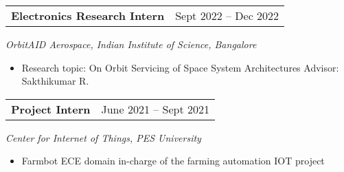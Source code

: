 \begin{tabular}{@{}p{4in}p{2in}}
  {\bf{Electronics Research Intern}} & Sept 2022 – Dec 2022 \\
\end{tabular}
\textit{OrbitAID Aerospace, Indian Institute of Science, Bangalore}  
\begin{itemize}
  \setlength\itemsep{0em}
  \item Research topic: On Orbit Servicing of Space System Architectures
  \subitem Advisor: Sakthikumar R.
\end{itemize}

\begin{tabular}{@{}p{4in}p{2in}}
  {\bf{Project Intern}} & June 2021 – Sept 2021 \\
\end{tabular}
\textit{Center for Internet of Things, PES University}  
\begin{itemize}
  \item Farmbot
  \subitem ECE domain in-charge of the farming automation IOT project
\end{itemize}
\endinput
